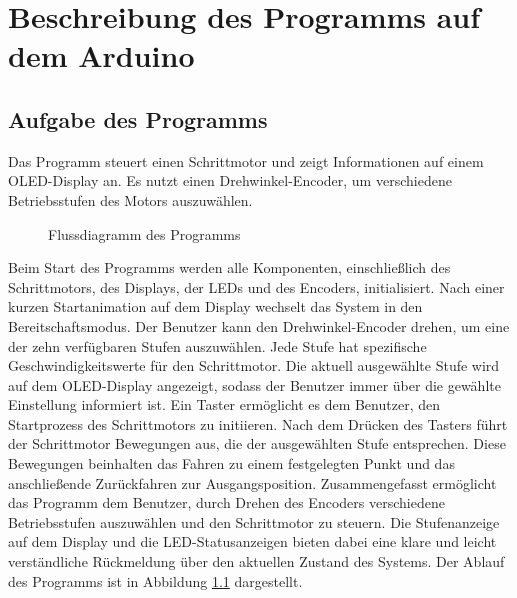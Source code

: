 %
%
%

\chapter{Beschreibung des Programms auf dem Arduino}

\section{Aufgabe des Programms}
Das Programm steuert einen Schrittmotor und zeigt Informationen auf einem OLED-Display an. Es nutzt einen Drehwinkel-Encoder, um verschiedene Betriebsstufen des Motors auszuwählen.

\begin{figure}[H]
	\begin{center}
		
		\caption{Flussdiagramm des Programms}
		\label{fluss}
	\end{center}
\end{figure}

Beim Start des Programms werden alle Komponenten, einschließlich des Schrittmotors, des Displays, der LEDs und des Encoders, initialisiert. Nach einer kurzen Startanimation auf dem Display wechselt das System in den Bereitschaftsmodus. Der Benutzer kann den Drehwinkel-Encoder drehen, um eine der zehn verfügbaren Stufen auszuwählen. Jede Stufe hat spezifische Geschwindigkeitswerte für den Schrittmotor. Die aktuell ausgewählte Stufe wird auf dem OLED-Display angezeigt, sodass der Benutzer immer über die gewählte Einstellung informiert ist. Ein Taster ermöglicht es dem Benutzer, den Startprozess des Schrittmotors zu initiieren. Nach dem Drücken des Tasters führt der Schrittmotor Bewegungen aus, die der ausgewählten Stufe entsprechen. Diese Bewegungen beinhalten das Fahren zu einem festgelegten Punkt und das anschließende Zurückfahren zur Ausgangsposition. Zusammengefasst ermöglicht das Programm dem Benutzer, durch Drehen des Encoders verschiedene Betriebsstufen auszuwählen und den Schrittmotor zu steuern. Die Stufenanzeige auf dem Display und die LED-Statusanzeigen bieten dabei eine klare und leicht verständliche Rückmeldung über den aktuellen Zustand des Systems. Der Ablauf des Programms ist in Abbildung \ref{fluss} dargestellt.


